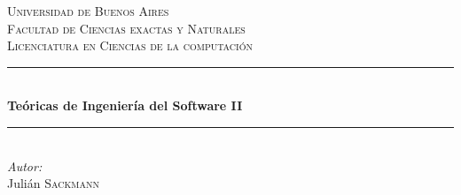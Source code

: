 \documentclass[]{article}
\begin{document}
\begin{titlepage}

\newcommand{\HRule}{\rule{\linewidth}{0.5mm}} %

\center %


\textsc{\LARGE Universidad de Buenos Aires}\\[1.5cm] %
\textsc{\Large Facultad de Ciencias exactas y Naturales}\\[0.5cm] %
\textsc{\large Licenciatura en Ciencias de la computación}\\[0.5cm] %


\HRule \\[0.4cm]
{ \huge \bfseries Teóricas de Ingeniería del Software II}\\[0.4cm] %
\HRule \\[1.5cm]

%

\Large \emph{Autor:}\\
Julián \textsc{Sackmann}\\[2cm] %


\end{titlepage}
\end{document}
